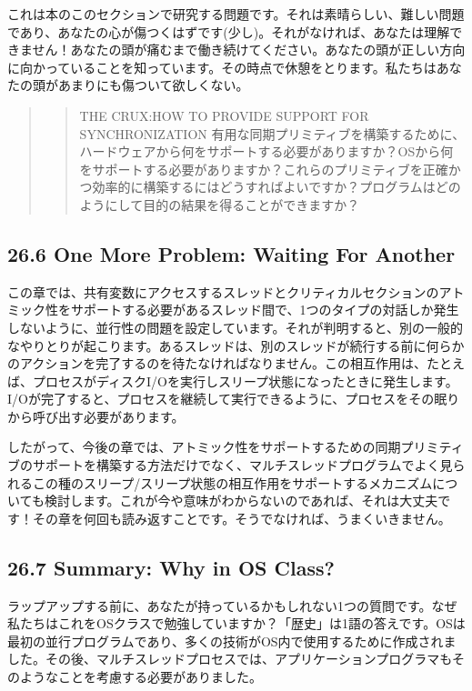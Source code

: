 これは本のこのセクションで研究する問題です。それは素晴らしい、難しい問題であり、あなたの心が傷つくはずです(少し)。それがなければ、あなたは理解できません！あなたの頭が痛むまで働き続けてください。あなたの頭が正しい方向に向かっていることを知っています。その時点で休憩をとります。私たちはあなたの頭があまりにも傷ついて欲しくない。

\begin{quote}
\begin{quote}
THE CRUX:HOW TO PROVIDE SUPPORT FOR SYNCHRONIZATION
有用な同期プリミティブを構築するために、ハードウェアから何をサポートする必要がありますか？OSから何をサポートする必要がありますか？これらのプリミティブを正確かつ効率的に構築するにはどうすればよいですか？プログラムはどのようにして目的の結果を得ることができますか？
\end{quote}
\end{quote}

\hypertarget{one-more-problem-waiting-for-another}{%
\subsection*{26.6 One More Problem: Waiting For
Another}\label{one-more-problem-waiting-for-another}}

この章では、共有変数にアクセスするスレッドとクリティカルセクションのアトミック性をサポートする必要があるスレッド間で、1つのタイプの対話しか発生しないように、並行性の問題を設定しています。それが判明すると、別の一般的なやりとりが起こります。あるスレッドは、別のスレッドが続行する前に何らかのアクションを完了するのを待たなければなりません。この相互作用は、たとえば、プロセスがディスクI/Oを実行しスリープ状態になったときに発生します。I/Oが完了すると、プロセスを継続して実行できるように、プロセスをその眠りから呼び出す必要があります。

したがって、今後の章では、アトミック性をサポートするための同期プリミティブのサポートを構築する方法だけでなく、マルチスレッドプログラムでよく見られるこの種のスリープ/スリープ状態の相互作用をサポートするメカニズムについても検討します。これが今や意味がわからないのであれば、それは大丈夫です！その章を何回も読み返すことです。そうでなければ、うまくいきません。

\hypertarget{summary-why-in-os-class}{%
\subsection*{26.7 Summary: Why in OS
Class?}\label{summary-why-in-os-class}}

ラップアップする前に、あなたが持っているかもしれない1つの質問です。なぜ私たちはこれをOSクラスで勉強していますか？「歴史」は1語の答えです。OSは最初の並行プログラムであり、多くの技術がOS内で使用するために作成されました。その後、マルチスレッドプロセスでは、アプリケーションプログラマもそのようなことを考慮する必要がありました。

